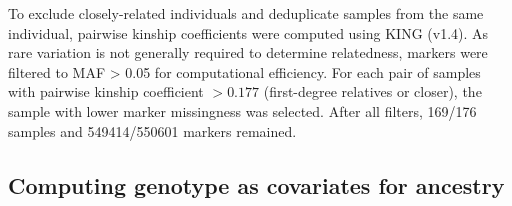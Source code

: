 To exclude closely-related individuals and deduplicate samples from the same individual, 
pairwise kinship coefficients were computed using KING (v1.4).
As rare variation is not generally required to determine relatedness, 
markers were filtered to \gls{MAF} \num{> 0.05} for computational efficiency.
For each pair of samples with pairwise kinship coefficient $> 0.177$ (first-degree relatives or closer), the sample with lower marker missingness was selected.
After all filters, 169/176 samples and \num{549414/550601} markers remained.

\subsection{Computing genotype  as covariates for ancestry}
\label{subsec:hird_dge_genotype_pc}

